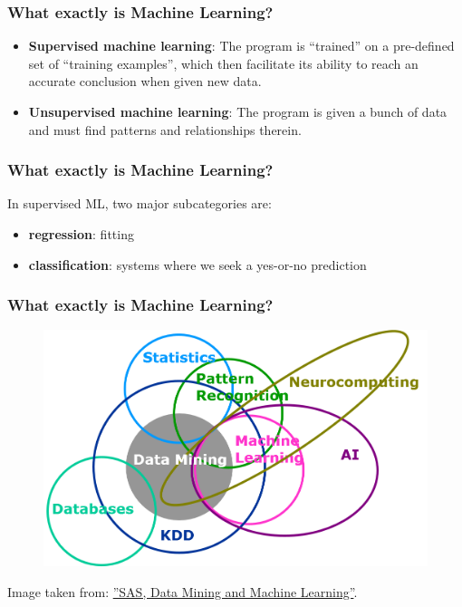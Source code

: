 \documentclass{beamer}
\begin{document}
\begin{frame}
\frametitle{What exactly is Machine Learning?}

\begin{itemize}
\item \textbf{Supervised machine learning}: The program is “trained” on a pre-defined set of “training examples”, which then facilitate its ability to reach an accurate conclusion when given new data.
\item \textbf{Unsupervised machine learning}: The program is given a bunch of data and must find patterns and relationships therein.
\end{itemize}


\end{frame}



\begin{frame}
\frametitle{What exactly is Machine Learning?}

In supervised ML, two major subcategories are:

\begin{itemize}
\item \textbf{regression}: fitting
\item \textbf{classification}: systems where we seek a yes-or-no prediction
\end{itemize}


\end{frame}



\begin{frame}
\frametitle{What exactly is Machine Learning?}
\begin{figure}
\includegraphics[width=0.8\linewidth]{data-mining-Venn-diagram}
\end{figure}
Image taken from: \hyperref[http://blogs.sas.com/content/subconsciousmusings/2014/08/22/looking-backwards-looking-forwards-sas-data-mining-and-machine-learning/]{''SAS, Data Mining and Machine Learning''}.
\end{frame}
\end{document}
